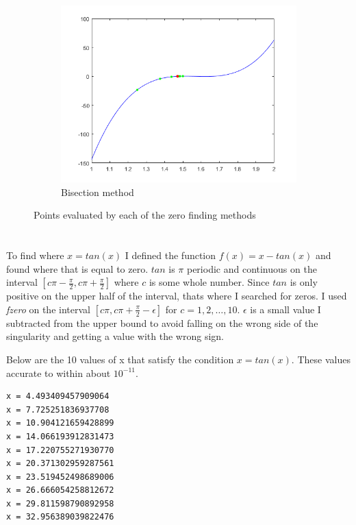 \documentclass[12pt]{article}
\begin{document}
\begin{figure}[t!]
\begin{subfigure}[t]{0.32\textwidth}
        \includegraphics[width=\linewidth]{px_bisection}
        \caption{Bisection method}
        \label{fig_bisection}
    \end{subfigure}
    \caption{Points evaluated by each of the zero finding methods}
    \label{fig_zero_search}
\end{figure}

\section{}

To find where $x = tan(x)$ I defined the function $f(x) = x-tan(x)$ and found where that is equal to zero. $tan$ is $\pi$ periodic and continuous on the interval $[c\pi - \frac{\pi}{2}, c\pi + \frac{\pi}{2}]$ where $c$ is some whole number. Since $tan$ is only positive on the upper half of the interval, thats where I searched for zeros. I used \textit{fzero} on the interval 
$[c\pi, c\pi + \frac{\pi}{2} - \epsilon]$ for $c = 1,2, \dots,10$. $\epsilon$ is a small value I subtracted from the upper bound to avoid falling on the wrong side of the singularity and getting a value with the wrong sign.

Below are the 10 values of x that satisfy the condition $x = tan(x)$. These values accurate to within about $10^{-11}$.

\begin{minipage}{\linewidth}
\begin{lstlisting}
x = 4.493409457909064
x = 7.725251836937708
x = 10.904121659428899
x = 14.066193912831473
x = 17.220755271930770
x = 20.371302959287561
x = 23.519452498689006
x = 26.666054258812672
x = 29.811598790892958
x = 32.956389039822476
\end{lstlisting}
\end{minipage}
\end{document}
